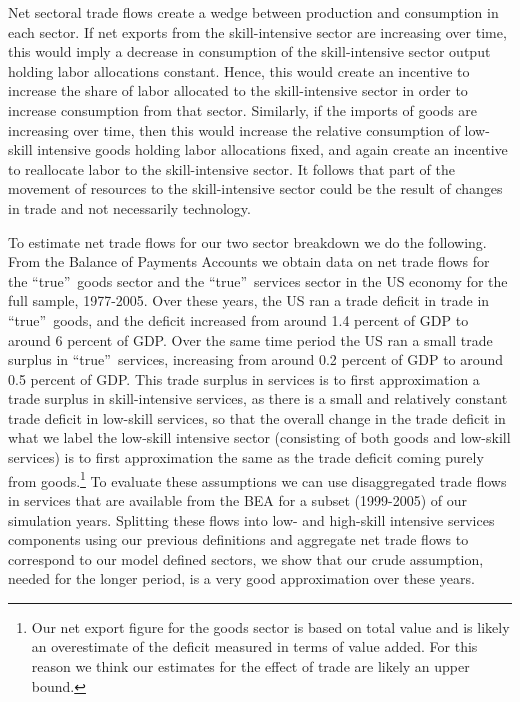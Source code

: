 \documentclass[12pt,english]{article}
\begin{document}
{\normalsize Net sectoral trade flows create a wedge between production and
consumption in each sector. If net exports from the skill-intensive sector
are increasing over time, this would imply a decrease in consumption of the
skill-intensive sector output holding labor allocations constant. Hence,
this would create an incentive to increase the share of labor allocated to
the skill-intensive sector in order to increase consumption from that
sector. Similarly, if the imports of goods are increasing over time, then
this would increase the relative consumption of low-skill intensive goods
holding labor allocations fixed, and again create an incentive to reallocate
labor to the skill-intensive sector. It follows that part of the movement of
resources to the skill-intensive sector could be the result of changes in
trade and not necessarily technology. }

{\normalsize To estimate net trade flows for our two sector breakdown we do
the following. From the Balance of Payments Accounts we obtain data on net
trade flows for the \textquotedblleft true\textquotedblright\ goods sector
and the \textquotedblleft true\textquotedblright\ services sector in the US
economy for the full sample, 1977-2005. Over these years, the US ran a trade
deficit in trade in \textquotedblleft true\textquotedblright\ goods, and the
deficit increased from around 1.4 percent of GDP to around 6 percent of GDP.
Over the same time period the US ran a small trade surplus in
\textquotedblleft true\textquotedblright\ services, increasing from around
0.2 percent of GDP to around 0.5 percent of GDP. This trade surplus in
services is to first approximation a trade surplus in skill-intensive
services, as there is a small and relatively constant trade deficit in
low-skill services, so that the overall change in the trade deficit in what
we label the low-skill intensive sector (consisting of both goods and
low-skill services) is to first approximation the same as the trade deficit
coming purely from goods.\footnote{%
Our net export figure for the goods sector is based on total value and is
likely an overestimate of the deficit measured in terms of value added. For
this reason we think our estimates for the effect of trade are likely an
upper bound.} To evaluate these assumptions we can use disaggregated trade
flows in services that are available from the BEA for a subset (1999-2005)
of our simulation years. Splitting these flows into low- and high-skill
intensive services components using our previous definitions and aggregate
net trade flows to correspond to our model defined sectors, we show that our
crude assumption, needed for the longer period, is a very good approximation
over these years. }
\end{document}
